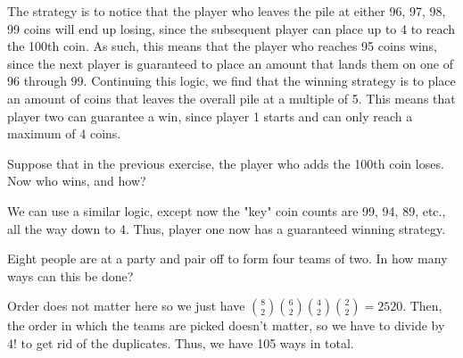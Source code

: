 \documentclass[10pt]{article}
\begin{document}
	\begin{solution}
		The strategy is to notice that the player who leaves the pile at either 96, 97, 98, 99 coins will end
		up losing, since the subsequent player can place up to 4 to reach the 100th coin. As such, this means
		that the player who reaches 95 coins wins, since the next player is guaranteed to place an amount
		that lands them on one of 96 through 99. Continuing this logic, we find that the winning strategy is
		to place an amount of coins that leaves the overall pile at a multiple of 5. This means that player
		two can guarantee a win, since player 1 starts and can only reach a maximum of 4 coins. 
	\end{solution}

	\begin{problem}
		Suppose that in the previous exercise, the player who adds the 100th coin loses. Now who wins, and
		how? 
	\end{problem}

	\begin{solution}
		We can use a similar logic, except now the "key" coin counts are 99, 94, 89, etc., all the way down
		to 4. Thus, player one now has a guaranteed winning strategy.  
	\end{solution}

	\begin{problem}
		Eight people are at a party and pair off to form four teams of two. In how many ways can this be
		done?
	\end{problem}

	\begin{solution}
		Order does not matter here so we just have \( {8 \choose 2}{6 \choose 2}{4 \choose 2}{2 \choose 2} =
		2520\). Then, the order in which the teams are picked doesn't matter, so we have to divide by \( 4!
		\) to get rid of the duplicates. Thus, we have 105 ways in total. 
	\end{solution}
\end{document}
